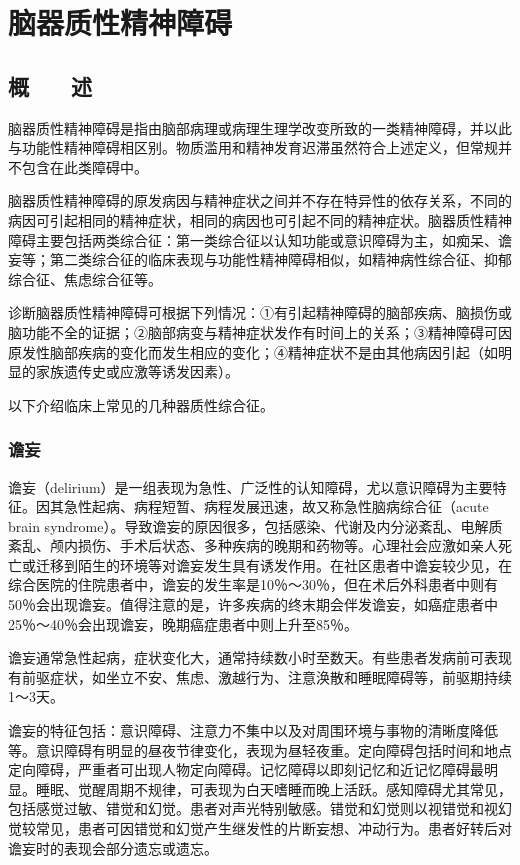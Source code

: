 \chapter{脑器质性精神障碍}

\section{概　　述}

脑器质性精神障碍是指由脑部病理或病理生理学改变所致的一类精神障碍，并以此与功能性精神障碍相区别。物质滥用和精神发育迟滞虽然符合上述定义，但常规并不包含在此类障碍中。

脑器质性精神障碍的原发病因与精神症状之间并不存在特异性的依存关系，不同的病因可引起相同的精神症状，相同的病因也可引起不同的精神症状。脑器质性精神障碍主要包括两类综合征：第一类综合征以认知功能或意识障碍为主，如痴呆、谵妄等；第二类综合征的临床表现与功能性精神障碍相似，如精神病性综合征、抑郁综合征、焦虑综合征等。

诊断脑器质性精神障碍可根据下列情况：①有引起精神障碍的脑部疾病、脑损伤或脑功能不全的证据；②脑部病变与精神症状发作有时间上的关系；③精神障碍可因原发性脑部疾病的变化而发生相应的变化；④精神症状不是由其他病因引起（如明显的家族遗传史或应激等诱发因素）。

以下介绍临床上常见的几种器质性综合征。

\subsection{谵妄}

谵妄（delirium）是一组表现为急性、广泛性的认知障碍，尤以意识障碍为主要特征。因其急性起病、病程短暂、病程发展迅速，故又称急性脑病综合征（acute
brain
syndrome）。导致谵妄的原因很多，包括感染、代谢及内分泌紊乱、电解质紊乱、颅内损伤、手术后状态、多种疾病的晚期和药物等。心理社会应激如亲人死亡或迁移到陌生的环境等对谵妄发生具有诱发作用。在社区患者中谵妄较少见，在综合医院的住院患者中，谵妄的发生率是10％～30％，但在术后外科患者中则有50％会出现谵妄。值得注意的是，许多疾病的终末期会伴发谵妄，如癌症患者中25％～40％会出现谵妄，晚期癌症患者中则上升至85％。

谵妄通常急性起病，症状变化大，通常持续数小时至数天。有些患者发病前可表现有前驱症状，如坐立不安、焦虑、激越行为、注意涣散和睡眠障碍等，前驱期持续1～3天。

谵妄的特征包括：意识障碍、注意力不集中以及对周围环境与事物的清晰度降低等。意识障碍有明显的昼夜节律变化，表现为昼轻夜重。定向障碍包括时间和地点定向障碍，严重者可出现人物定向障碍。记忆障碍以即刻记忆和近记忆障碍最明显。睡眠、觉醒周期不规律，可表现为白天嗜睡而晚上活跃。感知障碍尤其常见，包括感觉过敏、错觉和幻觉。患者对声光特别敏感。错觉和幻觉则以视错觉和视幻觉较常见，患者可因错觉和幻觉产生继发性的片断妄想、冲动行为。患者好转后对谵妄时的表现会部分遗忘或遗忘。

